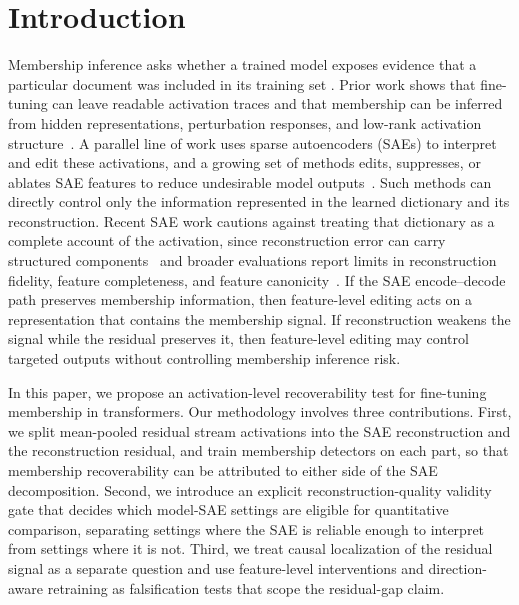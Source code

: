 \section{Introduction}
\label{sec:intro}

Membership inference asks whether a trained model exposes evidence that a particular document was included in its training set \cite{carlini2021extracting, carlini2023quantifying, shi2023detecting, zhang2025minkpp, wang2025recall}. Prior work shows that fine-tuning can leave readable activation traces and that membership can be inferred from hidden representations, perturbation responses, and low-rank activation structure~\citep{galli2024lumia,ferrando2026memtrace,minder2025narrow,huang2026gdrift,zhang2026gss}. A parallel line of work uses sparse autoencoders (SAEs) to interpret and edit these activations, and a growing set of methods edits, suppresses, or ablates SAE features to reduce undesirable model outputs~\citep{wang2025sspu,frikha2025privacyscalpel,suri2025mitigating,muhamed2025dsg}. Such methods can directly control only the information represented in the learned dictionary and its reconstruction. Recent SAE work cautions against treating that dictionary as a complete account of the activation, since reconstruction error can carry structured components~\citep{engels2024dark} and broader evaluations report limits in reconstruction fidelity, feature completeness, and feature canonicity~\citep{karvonen2025saebench,leask2025sparse}. If the SAE encode--decode path preserves membership information, then feature-level editing acts on a representation that contains the membership signal. If reconstruction weakens the signal while the residual preserves it, then feature-level editing may control targeted outputs without controlling membership inference risk.

In this paper, we propose an activation-level recoverability test for fine-tuning membership in transformers. Our methodology involves three contributions. First, we split mean-pooled residual stream activations into the SAE reconstruction and the reconstruction residual, and train membership detectors on each part, so that membership recoverability can be attributed to either side of the SAE decomposition. Second, we introduce an explicit reconstruction-quality validity gate that decides which model-SAE settings are eligible for quantitative comparison, separating settings where the SAE is reliable enough to interpret from settings where it is not. Third, we treat causal localization of the residual signal as a separate question and use feature-level interventions and direction-aware retraining as falsification tests that scope the residual-gap claim.

